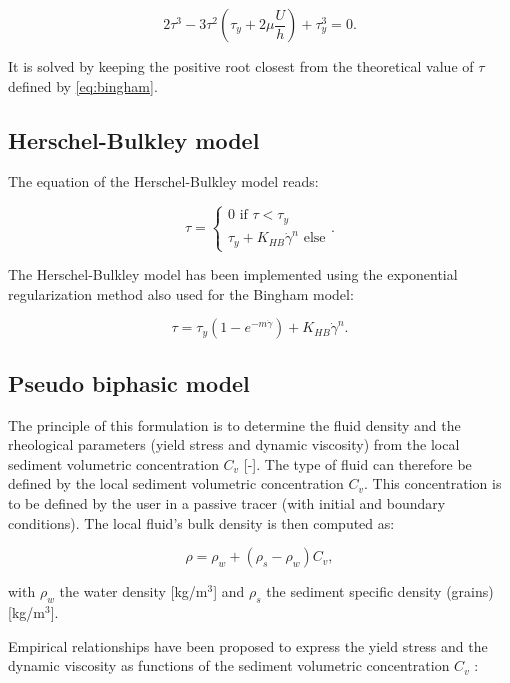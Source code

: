 \begin{equation}
2\tau^3-3\tau^2\left(\tau_y+2\mu \frac{U}{h}\right)+\tau_y^3=0.
\end{equation}

It is solved by keeping the positive root closest from the theoretical value of
$\tau$ defined by \eqref{eq:bingham}.

\subsection{Herschel-Bulkley model}

The equation of the Herschel-Bulkley model reads:

\begin{equation}
\tau=\left\{
\begin{array}{l}
0 \text{ if } \tau<\tau_y \\
\tau_y+K_{HB}\dot{\gamma}^n \text{ else}
\end{array}
\right..
\end{equation}

The Herschel-Bulkley model has been implemented using the exponential
regularization method also used for the Bingham model:

\begin{equation}
  \tau= \tau_y(1-e^{-m\dot{\gamma}})+K_{HB}\dot{\gamma}^n.
\end{equation}

\subsection{Pseudo biphasic model}

The principle of this formulation is to determine the fluid density and the
rheological parameters (yield stress and dynamic viscosity) from the local
sediment volumetric concentration $C_v$ [-].
The type of fluid can therefore be defined by the local sediment volumetric
concentration $C_v$.
This concentration is to be defined by the user in a passive tracer (with
initial and boundary conditions).
The local fluid's bulk density is then computed as:

\begin{equation}
  \rho = \rho_w+(\rho_s-\rho_w)C_v,
\end{equation}

with $\rho_w$ the water density [kg/m$^3$] and $\rho_s$ the sediment specific
density (grains) [kg/m$^3$].

Empirical relationships have been proposed to express the yield stress and the
dynamic viscosity as functions of the sediment volumetric concentration $C_v$
\cite{julien2010erosion}:

